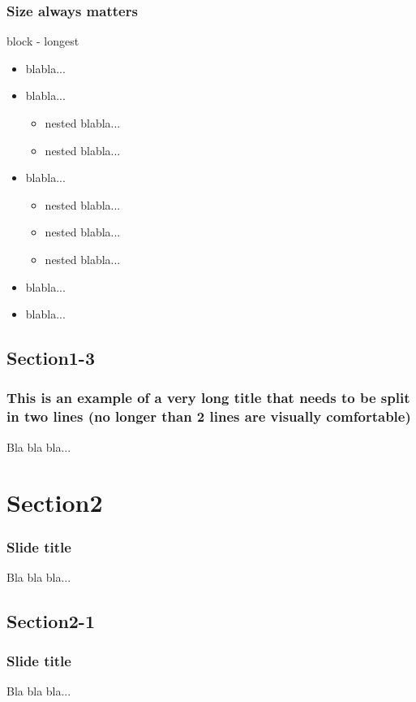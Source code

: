 \documentclass[t,compress,aspectratio=169]{beamer}
\begin{document}
\begin{frame}
\frametitle{Size always matters}
\begin{block}{block - longest}
  \begin{itemize}
    \item blabla...
    \item blabla...
    \begin{itemize}
      \item nested blabla...
      \item nested blabla...
    \end{itemize}
    \item blabla...
    \begin{itemize}
    \item nested blabla...
    \item nested blabla...
    \item nested blabla...
    \end{itemize}
    \item blabla...
    \item blabla...
  \end{itemize}
\end{block}
\end{frame}

\subsection{Section1-3}
\begin{frame}
\frametitle{This is an example of a very long title that needs to be split in two lines (no longer than 2 lines are visually comfortable)}
Bla bla bla...
\end{frame}



\section{Section2}
\begin{frame}
\frametitle{Slide title}
Bla bla bla...
\end{frame}

\subsection{Section2-1}
\begin{frame}
\frametitle{Slide title}
Bla bla bla...
\end{frame}
\end{document}
